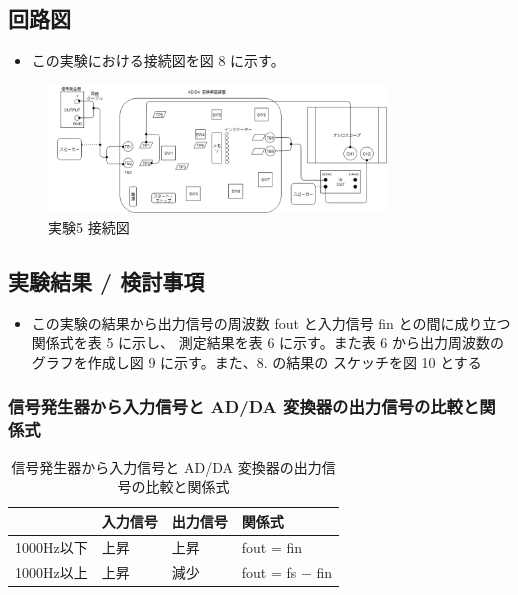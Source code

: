\documentclass[10pt]{article}
\begin{document}
\subsection{回路図}

\begin{itemize}
    \item この実験における接続図を図 8 に示す。 
\end{itemize}

\begin{figure}[H]
		\centering
		\includegraphics[width=0.8\textwidth]{exp5.png}
		\caption{実験5 接続図}
	\end{figure}

\subsection{実験結果 / 検討事項}

\begin{itemize}
    \item この実験の結果から出力信号の周波数 fout と入力信号 fin との間に成り立つ関係式を表 5 に示し、 測定結果を表 6 に示す。また表 6 から出力周波数のグラフを作成し図 9 に示す。また、8. の結果の スケッチを図 10 とする
\end{itemize}

\subsubsection{信号発生器から入力信号と AD/DA 変換器の出力信号の比較と関係式 }

\begingroup
\setlength{\tabcolsep}{5pt} %
\renewcommand{\arraystretch}{1.5} %
\begin{table}[H]
    \centering
	\caption{信号発生器から入力信号と AD/DA 変換器の出力信号の比較と関係式}
	\begin{tabular}{|l|l|l|l|}
	    \hline
	     & 入力信号 & 出力信号 & 関係式 \\[0.5ex]
		\hline\hline
		 1000Hz以下 & 上昇 & 上昇 & fout = fin \\ \hline
		 1000Hz以上 & 上昇 & 減少 & fout = fs $-$ fin \\ \hline
	\end{tabular}
\end{table} 
\endgroup
\end{document}
